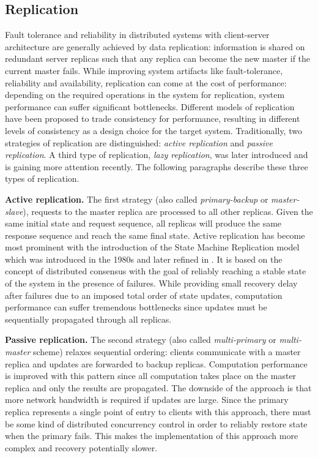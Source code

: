 \subsection{Replication}
\label{sec:replication}

Fault tolerance and reliability in distributed systems with client-server architecture are generally achieved by data replication: information is shared on redundant server replicas such that any replica can become the new master if the current master fails. While improving system artifacts like fault-tolerance, reliability and availability, replication can come at the cost of performance: depending on the required operations in the system for replication, system performance can suffer significant bottlenecks. Different models of replication have been proposed to trade consistency for performance, resulting in different levels of consistency as a design choice for the target system. Traditionally, two strategies of replication are distinguished: \textit{active replication} and \textit{passive replication}. A third type of replication, \textit{lazy replication}, was later introduced and is gaining more attention recently. The following paragraphs describe these three types of replication.

\textbf{Active replication.} The first strategy (also called \textit{primary-backup} or \textit{master-slave}), requests to the master replica are processed to all other replicas. Given the same initial state and request sequence, all replicas will produce the same response sequence and reach the same final state. Active replication has become most prominent with the introduction of the State Machine Replication model which was introduced in the 1980s \cite{Lamport:1984} and later refined in \cite{Schneider:1990}. It is based on the concept of distributed consensus with the goal of reliably reaching a stable state of the system in the presence of failures. While providing small recovery delay after failures due to an imposed total order of state updates, computation performance can suffer tremendous bottlenecks since updates must be sequentially propagated through all replicas. 

\textbf{Passive replication.} The second strategy (also called \textit{multi-primary} or \textit{multi-master} scheme) relaxes sequential ordering: clients communicate with a master replica and updates are forwarded to backup replicas. Computation performance is improved with this pattern since all computation takes place on the master replica and only the results are propagated. The downside of the approach is that more network bandwidth is required if updates are large. Since the primary replica represents a single point of entry to clients with this approach, there must be some kind of distributed concurrency control in order to reliably restore state when the primary fails. This makes the implementation of this approach more complex and recovery potentially slower.

